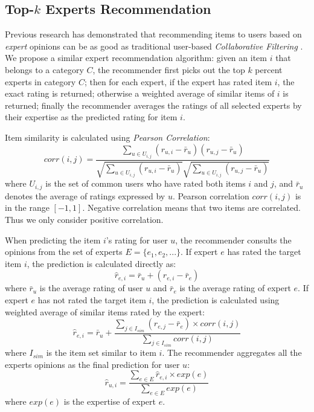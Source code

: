 \documentclass[12pt]{article}
\begin{document}

\subsection{Top-$k$ Experts Recommendation} %
\label{sub:expert_recommendation}

Previous research has demonstrated that recommending items to users based on \emph{expert} opinions can be as good as traditional user-based \emph{Collaborative Filtering} \cite{Amatriain:2009p101}. We propose a similar expert recommendation algorithm: given an item $i$ that belongs to a category $C$, the recommender first picks out the top $k$ percent experts in category $C$; then for each expert, if the expert has rated item $i$, the exact rating is returned; otherwise a weighted average of similar items of $i$ is returned; finally the recommender averages the ratings of all selected experts by their expertise as the predicted rating for item $i$. 

Item similarity is calculated using \emph{Pearson Correlation}:
\begin{equation}
	corr(i,j) = \frac{\sum_{u \in U_{i,j}} (r_{u,i} - \bar{r}_u)(r_{u,j} - \bar{r}_u)} {{\sqrt{\sum_{u \in U_{i,j}} (r_{u,i} - \bar{r}_u)}} \sqrt{\sum_{u \in U_{i,j}} (r_{u,j} - \bar{r}_u)}}
\end{equation}
where $U_{i,j}$ is the set of common users who have rated both items $i$ and $j$, and $\bar{r}_u$ denotes the average of ratings expressed by $u$. Pearson correlation $corr(i,j)$ is in the range $[-1,1]$. Negative correlation means that two items are correlated. Thus we only consider positive correlation.

When predicting the item $i$'s rating for user $u$, the recommender consults the opinions from the set of experts $E = \{e_1, e_2, ...\}$. If expert $e$ has rated the target item $i$, the prediction is calculated directly as:
\begin{equation}
	\hat{r}_{e,i} = \bar{r}_u + (r_{e,i} - \bar{r}_e)
\end{equation}
where $\bar{r}_u$ is the average rating of user $u$ and $\bar{r}_e$ is the average rating of expert $e$. If expert $e$ has not rated the target item $i$, the prediction is calculated using weighted average of similar items rated by the expert:
\begin{equation}
	\hat{r}_{e,i} = \bar{r}_u + \frac{\sum_{j \in I_{sim}} (r_{e,j} - \bar{r}_e) \times corr(i,j)} {\sum_{j \in I_{sim}} corr(i,j)}
\end{equation}
where $I_{sim}$ is the item set similar to item $i$. The recommender aggregates all the experts opinions as the final prediction for user $u$:
\begin{equation}
	\hat{r}_{u,i} = \frac{ \sum_{e \in E} \hat{r}_{e,i} \times exp(e) } { \sum_{e \in E} exp(e) }
\end{equation}
where $exp(e)$ is the expertise of expert $e$.
\end{document}
